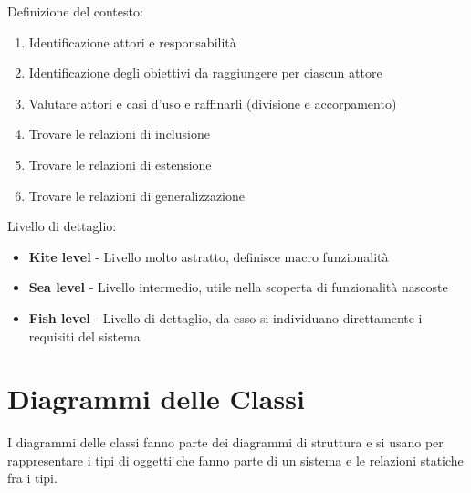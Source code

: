 Definizione del contesto:
\begin{enumerate}
\item Identificazione attori e responsabilità
\item Identificazione degli obiettivi da raggiungere per ciascun attore
\item Valutare attori e casi d'uso e raffinarli (divisione e accorpamento)
\item Trovare le relazioni di inclusione
\item Trovare le relazioni di estensione
\item Trovare le relazioni di generalizzazione
\end{enumerate}
Livello di dettaglio:
\begin{itemize}
\item \textbf{Kite level} - Livello molto astratto, definisce macro funzionalità
\item \textbf{Sea level} - Livello intermedio, utile nella scoperta di funzionalità nascoste
\item \textbf{Fish level} - Livello di dettaglio, da esso si individuano direttamente i requisiti del sistema
\end{itemize}

\section{Diagrammi delle Classi}
I diagrammi delle classi fanno parte dei diagrammi di struttura e si usano per rappresentare i tipi di oggetti che fanno parte di un sistema e le relazioni statiche fra i tipi. 

